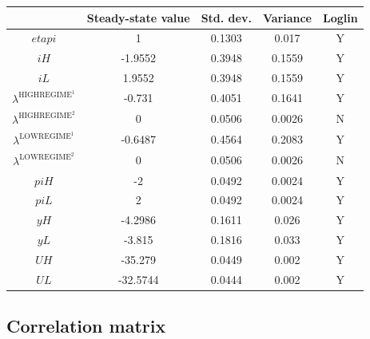 \begin{tabular}{c|c|c|c|c|}
  & Steady-state value & Std. dev. & Variance & Loglin\\
\hline
${e\!t\!a\!p\!i}$ & 1 & 0.1303 & 0.017 & Y    \\
${i\!H}$ & -1.9552 & 0.3948 & 0.1559 & Y    \\
${i\!L}$ & 1.9552 & 0.3948 & 0.1559 & Y    \\
$\lambda^{\mathrm{HIGHREGIME}^{\mathrm{1}}}$ & -0.731 & 0.4051 & 0.1641 & Y    \\
$\lambda^{\mathrm{HIGHREGIME}^{\mathrm{2}}}$ & 0 & 0.0506 & 0.0026 & N    \\
$\lambda^{\mathrm{LOWREGIME}^{\mathrm{1}}}$ & -0.6487 & 0.4564 & 0.2083 & Y    \\
$\lambda^{\mathrm{LOWREGIME}^{\mathrm{2}}}$ & 0 & 0.0506 & 0.0026 & N    \\
${p\!i\!H}$ & -2 & 0.0492 & 0.0024 & Y    \\
${p\!i\!L}$ & 2 & 0.0492 & 0.0024 & Y    \\
${y\!H}$ & -4.2986 & 0.1611 & 0.026 & Y    \\
${y\!L}$ & -3.815 & 0.1816 & 0.033 & Y    \\
${U\!H}$ & -35.279 & 0.0449 & 0.002 & Y    \\
${U\!L}$ & -32.5744 & 0.0444 & 0.002 & Y    \\
\hline
\end{tabular}


\subsection{Correlation matrix}

